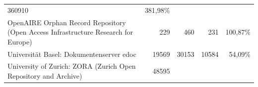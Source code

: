 \documentclass[a4paper,
fontsize=11pt,
oneside,
numbers=noperiodatend,
parskip=half-,
bibliography=totoc,
final
]{scrartcl}
\begin{document}
\begin{longtable}[c]{@{}lrrrr@{}}
\begin{minipage}[t]{0.14\columnwidth}\raggedleft\strut
360910
\strut\end{minipage} &
\begin{minipage}[t]{0.14\columnwidth}\raggedleft\strut
381,98\%
\strut\end{minipage}\tabularnewline
\begin{minipage}[t]{0.25\columnwidth}\raggedright\strut
OpenAIRE Orphan Record Repository (Open Access Infrastructure Research
for Europe)
\strut\end{minipage} &
\begin{minipage}[t]{0.16\columnwidth}\raggedleft\strut
229
\strut\end{minipage} &
\begin{minipage}[t]{0.16\columnwidth}\raggedleft\strut
460
\strut\end{minipage} &
\begin{minipage}[t]{0.14\columnwidth}\raggedleft\strut
231
\strut\end{minipage} &
\begin{minipage}[t]{0.14\columnwidth}\raggedleft\strut
100,87\%
\strut\end{minipage}\tabularnewline
\begin{minipage}[t]{0.25\columnwidth}\raggedright\strut
Universität Basel: Dokumentenserver edoc
\strut\end{minipage} &
\begin{minipage}[t]{0.16\columnwidth}\raggedleft\strut
19569
\strut\end{minipage} &
\begin{minipage}[t]{0.16\columnwidth}\raggedleft\strut
30153
\strut\end{minipage} &
\begin{minipage}[t]{0.14\columnwidth}\raggedleft\strut
10584
\strut\end{minipage} &
\begin{minipage}[t]{0.14\columnwidth}\raggedleft\strut
54,09\%
\strut\end{minipage}\tabularnewline
\begin{minipage}[t]{0.25\columnwidth}\raggedright\strut
University of Zurich: ZORA (Zurich Open Repository and Archive)
\strut\end{minipage} &
\begin{minipage}[t]{0.16\columnwidth}\raggedleft\strut
48595
\strut\end{minipage} &
\begin{minipage}[t]{0.16\columnwidth}\raggedleft\strut

\end{minipage}
\end{longtable}
\end{document}
